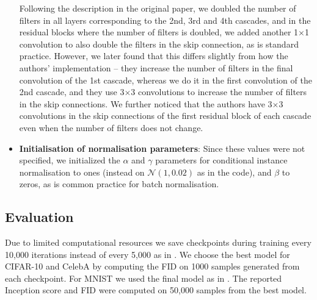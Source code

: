 \begin{itemize}
    Following the description in the original paper, we doubled the number of filters in all layers corresponding to the 2nd, 3rd and 4th cascades, and in the residual blocks where the number of filters is doubled, we added another 1$\times$1 convolution to also double the filters in the skip connection, as is standard practice. However, we later found that this differs slightly from how the authors' implementation -- they increase the number of filters in the final convolution of the 1st cascade, whereas we do it in the first convolution of the 2nd cascade, and they use 3$\times$3 convolutions to increase the number of filters in the skip connections. We further noticed that the authors have 3$\times$3 convolutions in the skip connections of the first residual block of each cascade even when the number of filters does not change.
    \item %
    \textbf{Initialisation of normalisation parameters}: Since these values were not specified, we initialized the $\alpha$ and $\gamma$ parameters for conditional instance normalisation to ones (instead on $\mathcal{N}(1, 0.02)$ as in the code), and $\beta$ to zeros, as is common practice for batch normalisation.
\end{itemize}




\subsection{Evaluation}
\label{sec:eval}

Due to limited computational resources we save checkpoints during training every 10,000 iterations instead of every 5,000 as in \cite{ncsn-paper}. We choose the best model for CIFAR-10 and CelebA by computing the FID on 1000 samples generated from each checkpoint. For MNIST we used the final model as in \cite{ncsn-paper}. The reported Inception score and FID were computed on 50,000 samples from the best model.
